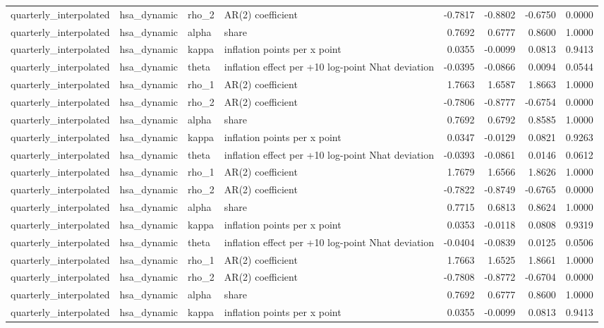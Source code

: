 \begin{tabular}{llllrrrr}
quarterly\_interpolated & hsa\_dynamic & rho\_2 & AR(2) coefficient & -0.7817 & -0.8802 & -0.6750 & 0.0000 \\
quarterly\_interpolated & hsa\_dynamic & alpha & share & 0.7692 & 0.6777 & 0.8600 & 1.0000 \\
quarterly\_interpolated & hsa\_dynamic & kappa & inflation points per x point & 0.0355 & -0.0099 & 0.0813 & 0.9413 \\
quarterly\_interpolated & hsa\_dynamic & theta & inflation effect per +10 log-point Nhat deviation & -0.0395 & -0.0866 & 0.0094 & 0.0544 \\
quarterly\_interpolated & hsa\_dynamic & rho\_1 & AR(2) coefficient & 1.7663 & 1.6587 & 1.8663 & 1.0000 \\
quarterly\_interpolated & hsa\_dynamic & rho\_2 & AR(2) coefficient & -0.7806 & -0.8777 & -0.6754 & 0.0000 \\
quarterly\_interpolated & hsa\_dynamic & alpha & share & 0.7692 & 0.6792 & 0.8585 & 1.0000 \\
quarterly\_interpolated & hsa\_dynamic & kappa & inflation points per x point & 0.0347 & -0.0129 & 0.0821 & 0.9263 \\
quarterly\_interpolated & hsa\_dynamic & theta & inflation effect per +10 log-point Nhat deviation & -0.0393 & -0.0861 & 0.0146 & 0.0612 \\
quarterly\_interpolated & hsa\_dynamic & rho\_1 & AR(2) coefficient & 1.7679 & 1.6566 & 1.8626 & 1.0000 \\
quarterly\_interpolated & hsa\_dynamic & rho\_2 & AR(2) coefficient & -0.7822 & -0.8749 & -0.6765 & 0.0000 \\
quarterly\_interpolated & hsa\_dynamic & alpha & share & 0.7715 & 0.6813 & 0.8624 & 1.0000 \\
quarterly\_interpolated & hsa\_dynamic & kappa & inflation points per x point & 0.0353 & -0.0118 & 0.0808 & 0.9319 \\
quarterly\_interpolated & hsa\_dynamic & theta & inflation effect per +10 log-point Nhat deviation & -0.0404 & -0.0839 & 0.0125 & 0.0506 \\
quarterly\_interpolated & hsa\_dynamic & rho\_1 & AR(2) coefficient & 1.7663 & 1.6525 & 1.8661 & 1.0000 \\
quarterly\_interpolated & hsa\_dynamic & rho\_2 & AR(2) coefficient & -0.7808 & -0.8772 & -0.6704 & 0.0000 \\
quarterly\_interpolated & hsa\_dynamic & alpha & share & 0.7692 & 0.6777 & 0.8600 & 1.0000 \\
quarterly\_interpolated & hsa\_dynamic & kappa & inflation points per x point & 0.0355 & -0.0099 & 0.0813 & 0.9413 \\

\end{tabular}
